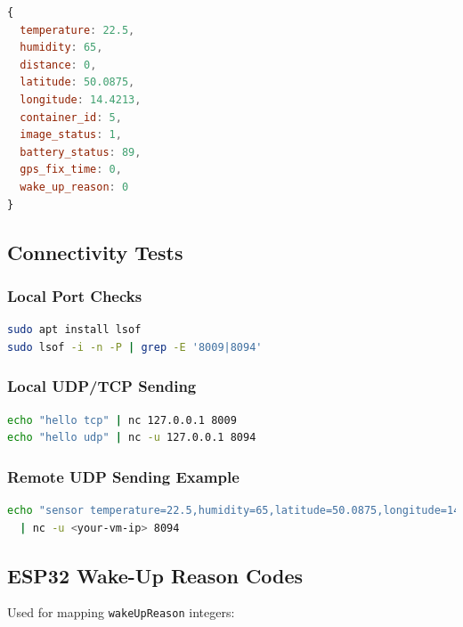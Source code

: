 \documentclass[11pt,a4paper]{article}
\begin{document}
\begin{lstlisting}[language=JavaScript]
{
  temperature: 22.5,
  humidity: 65,
  distance: 0,
  latitude: 50.0875,
  longitude: 14.4213,
  container_id: 5,
  image_status: 1,
  battery_status: 89,
  gps_fix_time: 0,
  wake_up_reason: 0
}
\end{lstlisting}

\subsection*{Connectivity Tests}

\subsubsection*{Local Port Checks}
\begin{lstlisting}[language=bash]
sudo apt install lsof
sudo lsof -i -n -P | grep -E '8009|8094'
\end{lstlisting}

\subsubsection*{Local UDP/TCP Sending}
\begin{lstlisting}[language=bash]
echo "hello tcp" | nc 127.0.0.1 8009
echo "hello udp" | nc -u 127.0.0.1 8094
\end{lstlisting}

\subsubsection*{Remote UDP Sending Example}
\begin{lstlisting}[language=bash]
echo "sensor temperature=22.5,humidity=65,latitude=50.0875,longitude=14.4213,battery=89" \
  | nc -u <your-vm-ip> 8094
\end{lstlisting}

\subsection*{ESP32 Wake-Up Reason Codes}
Used for mapping \texttt{wakeUpReason} integers:
\end{document}
